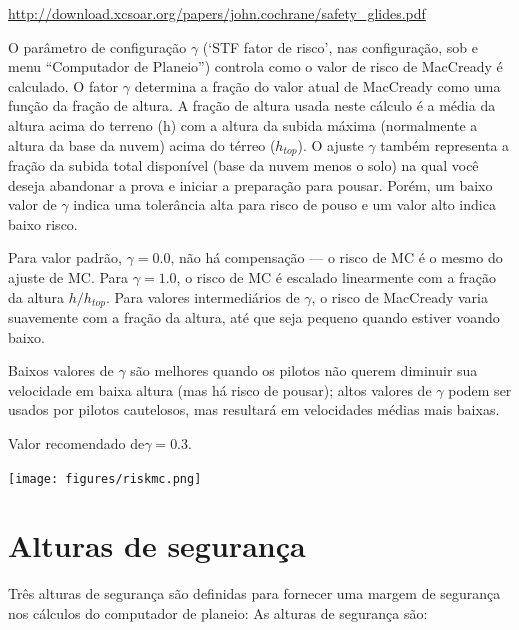 \url{http://download.xcsoar.org/papers/john.cochrane/safety_glides.pdf}

O parâmetro de configuração $\gamma$ (‘STF fator de risco’, nas configuração, sob e menu “Computador de Planeio”) controla como o valor de risco de MacCready é calculado.  O fator $\gamma$  determina a fração do valor atual de MacCready como uma função da fração de altura.  A fração de altura usada neste cálculo é a média da altura acima do terreno (h) com a altura da subida máxima (normalmente a altura da base da nuvem) acima do térreo  ($h_{top}$).  O ajuste $\gamma$ também representa a fração da subida total disponível (base da nuvem menos o solo) na qual você deseja abandonar a prova e iniciar a preparação para pousar.  Porém, um baixo valor de $\gamma$ indica uma tolerância alta para risco de pouso e um valor alto indica baixo risco.

  Para valor padrão, $\gamma=0.0$, não há compensação ---
o risco de MC é o mesmo do ajuste de MC.  Para $\gamma=1.0$,  o risco de MC é escalado linearmente com a fração da altura $h/h_{top}$.
  Para valores intermediários de $\gamma$, o risco de MacCready varia suavemente com a fração da altura, até que seja pequeno quando estiver voando baixo.

 Baixos valores de $\gamma$  são melhores quando os pilotos não querem diminuir sua velocidade em baixa altura (mas há risco de pousar);  altos valores de $\gamma$ podem ser usados por pilotos cautelosos, mas resultará em velocidades médias mais baixas.

  Valor recomendado de$\gamma=0.3$.

\begin{center}
\texttt{[image: figures/riskmc.png]}
\end{center}


\section{Alturas de segurança}\label{sec:safety-heights}

Três alturas de segurança são definidas para fornecer uma margem de segurança nos cálculos do computador de planeio:
As alturas de segurança são:

